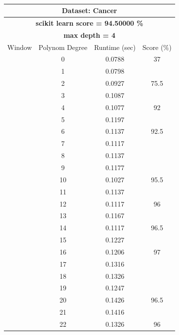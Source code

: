 \documentclass{article}
\begin{document}
\newpage
\begin{multicols}{2}

\begin{table}[H]
\caption{}
\label{tab:my-table}
\begin{tabular}{|c|c|c|c|}
\hline
\multicolumn{4}{|c|}{\textbf{Dataset: Cancer}} \\ \hline
\multicolumn{4}{|c|}{\textbf{scikit learn score = 94.50000  \%}} \\ \hline
\multicolumn{4}{|c|}{\textbf{max depth = 4}} \\ \hline
Window & Polynom Degree & Runtime (sec) & Score (\%) \\ \hline
 & 0 & 0.0788 & 37 \\ \cline{2-4} 
 & 1 & 0.0798 &  \\ \cline{2-3}
 & 2 & 0.0927 & \multirow{-2}{*}{75.5} \\ \cline{2-4} 
 & 3 & 0.1087 &  \\ \cline{2-3}
 & 4 & 0.1077 & \multirow{-2}{*}{92} \\ \cline{2-4} 
 & 5 & 0.1197 &  \\ \cline{2-3}
 & 6 & 0.1137 & \multirow{-2}{*}{92.5} \\ \cline{2-4} 
 & 7 & 0.1117 &  \\ \cline{2-3}
 & 8 & 0.1137 &  \\ \cline{2-3}
 & 9 & 0.1177 &  \\ \cline{2-3}
 & 10 & 0.1027 & \multirow{-4}{*}{95.5} \\ \cline{2-4} 
 & 11 & 0.1137 &  \\ \cline{2-3}
 & 12 & 0.1117 & \multirow{-2}{*}{96} \\ \cline{2-4} 
 & 13 & 0.1167 &  \\ \cline{2-3}
 & 14 & 0.1117 & \multirow{-2}{*}{96.5} \\ \cline{2-4} 
 & \cellcolor[HTML]{FFFFC7}15 & \cellcolor[HTML]{FFFFC7}0.1227 & \cellcolor[HTML]{FFFFC7} \\ \cline{2-3}
 & 16 & 0.1206 & \multirow{-2}{*}{\cellcolor[HTML]{FFFFC7}97} \\ \cline{2-4} 
 & 17 & 0.1316 &  \\ \cline{2-3}
 & 18 & 0.1326 &  \\ \cline{2-3}
 & 19 & 0.1247 &  \\ \cline{2-3}
 & 20 & 0.1426 & \multirow{-4}{*}{96.5} \\ \cline{2-4} 
 & 21 & 0.1416 &  \\ \cline{2-3}
 & 22 & 0.1326 & \multirow{-2}{*}{96} \\ \cline{2-4} 

\end{tabular}
\end{table}
\end{multicols}
\end{document}
